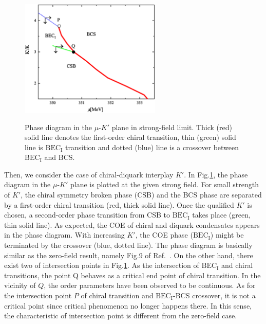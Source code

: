 \documentclass[prd, showpacs,nofootinbib,amsmath,amssymb,12pt]{revtex4}
\begin{document}
\begin{figure}[h]
\caption{Phase diagram in the $\mu$-$K'$ plane in strong-field limit.
Thick (red) solid line denotes the first-order chiral transition, thin (green) solid line is $\text{BEC}_\text{I}$
transition and dotted (blue) line is a crossover between $\text{BEC}_\text{I}$ and $\text{BCS}$.}
\centering
\includegraphics[width=0.6\textwidth]{kmu.eps}
\label{fig:kmu}
\end{figure}

Then, we consider the case of chiral-diquark interplay $K'$.
In Fig.\ref{fig:kmu}, the phase diagram in the $\mu$-$K'$ plane is plotted at the given strong field. 
For small strength of $K'$, the chiral symmetry broken phase (CSB) and the BCS phase are separated by a first-order chiral transition (red, thick solid line).
Once the qualified $K'$ is chosen, a second-order phase transition from CSB to 
$\text{BEC}_\text{I}$ takes place (green, thin solid line). As expected, the COE of chiral and diquark condensates appears in the phase diagram. With increasing $K'$, the COE phase ($\text{BEC}_\text{I}$) might be terminated by the crossover (blue, dotted line). The phase diagram is basically similar as the zero-field result, namely Fig.9 of Ref.~\cite{abuki2010nambu}.
On the other hand, there exist two of intersection points in Fig.\ref{fig:kmu}. As the intersection of $\text{BEC}_\text{I}$ and chiral transitions, the point Q behaves as a critical end point of chiral transition. In the vicinity of $Q$, the order parameters have been observed to be continuous.
As for the intersection point $P$ of chiral transition and $\text{BEC}_\text{I}$-BCS crossover, it is not a critical point since  
critical phenomenon no longer happens there. In this sense, the characteristic of intersection point is different from the zero-field case.
\end{document}
